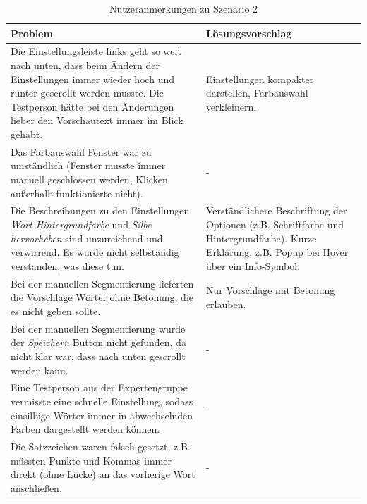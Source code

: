 \begin{table}
	\centering
	\begin{tabular}{|p{}|p{}|}
		\hline
		\textbf{Problem} & \textbf{Lösungsvorschlag}\\
		\hline
		\hline
		Die Einstellungsleiste links geht so weit nach unten, dass beim Ändern der Einstellungen immer wieder hoch und runter gescrollt werden musste. Die Testperson hätte bei den Änderungen lieber den Vorschautext immer im Blick gehabt. & Einstellungen kompakter darstellen, Farbauswahl verkleinern.\\
		\hline
		Das Farbauswahl Fenster war zu umständlich (Fenster musste immer manuell geschlossen werden, Klicken außerhalb funktionierte nicht). & -\\
		\hline
		Die Beschreibungen zu den Einstellungen \textit{Wort Hintergrundfarbe} und \textit{Silbe hervorheben} sind unzureichend und verwirrend. Es wurde nicht selbständig verstanden, was diese tun. & Verständlichere Beschriftung der Optionen (z.B. Schriftfarbe und Hintergrundfarbe). Kurze Erklärung, z.B. Popup bei Hover über ein Info-Symbol.\\
		\hline
		Bei der manuellen Segmentierung lieferten die Vorschläge Wörter ohne Betonung, die es nicht geben sollte. & Nur Vorschläge mit Betonung erlauben.\\
		\hline
		Bei der manuellen Segmentierung wurde der \textit{Speichern} Button nicht gefunden, da nicht klar war, dass nach unten gescrollt werden kann. & -\\
		\hline
		Eine Testperson aus der Expertengruppe vermisste eine schnelle Einstellung, sodass einsilbige Wörter immer in abwechselnden Farben dargestellt werden können. & -\\
		\hline
		Die Satzzeichen waren falsch gesetzt, z.B. müssten Punkte und Kommas immer direkt (ohne Lücke) an das vorherige Wort anschließen. & -\\
		\hline
	\end{tabular}
	\caption{Nutzeranmerkungen zu Szenario 2}
	\label{table:szenario2}
\end{table}

